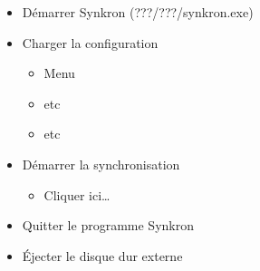 %
%

\begin{itemize}

\item
  Démarrer Synkron (???/???/synkron.exe)
\item
  Charger la configuration

  \begin{itemize}
  
  \item
    Menu
  \item
    etc
  \item
    etc
  \end{itemize}
\item
  Démarrer la synchronisation

  \begin{itemize}
  
  \item
    Cliquer ici\ldots{}
  \end{itemize}
\item
  Quitter le programme Synkron
\item
  Éjecter le disque dur externe
\end{itemize}
